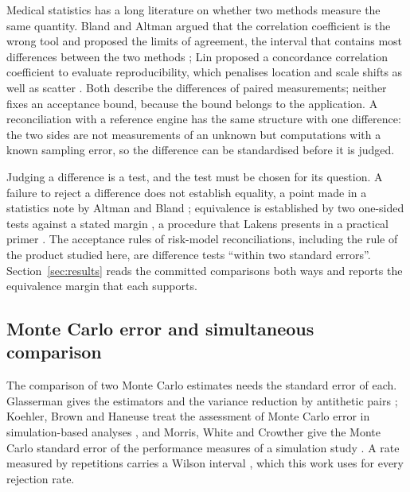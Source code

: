 Medical statistics has a long literature on whether two methods measure the same quantity. Bland and Altman argued that the correlation coefficient is the wrong tool and proposed the limits of agreement, the interval that contains most differences between the two methods \citep{bland1986}; Lin proposed a concordance correlation coefficient to evaluate reproducibility, which penalises location and scale shifts as well as scatter \citep{lin1989}. Both describe the differences of paired measurements; neither fixes an acceptance bound, because the bound belongs to the application. A reconciliation with a reference engine has the same structure with one difference: the two sides are not measurements of an unknown but computations with a known sampling error, so the difference can be standardised before it is judged.

Judging a difference is a test, and the test must be chosen for its question. A failure to reject a difference does not establish equality, a point made in a statistics note by Altman and Bland \citep{altman1995}; equivalence is established by two one-sided tests against a stated margin \citep{schuirmann1987}, a procedure that Lakens presents in a practical primer \citep{lakens2017}. The acceptance rules of risk-model reconciliations, including the rule of the product studied here, are difference tests ``within two standard errors''. Section~\ref{sec:results} reads the committed comparisons both ways and reports the equivalence margin that each supports.

\subsection{Monte Carlo error and simultaneous comparison}
\label{sec:rw-montecarlo}

The comparison of two Monte Carlo estimates needs the standard error of each. Glasserman gives the estimators and the variance reduction by antithetic pairs \citep{glasserman2004}; Koehler, Brown and Haneuse treat the assessment of Monte Carlo error in simulation-based analyses \citep{koehler2009}, and Morris, White and Crowther give the Monte Carlo standard error of the performance measures of a simulation study \citep{morris2019}. A rate measured by repetitions carries a Wilson interval \citep{brown2001}, which this work uses for every rejection rate.

